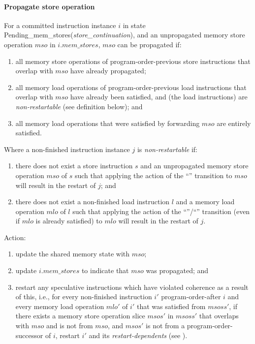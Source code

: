 \paragraph{Propagate store operation}\label{omm:prop_store}
For a committed instruction instance $i$ in state {\sc Pending\_mem\_stores}({\it store\_continuation}), and an unpropagated memory store operation $mso$ in $i.\textit{mem\_stores}$, $mso$ can be propagated if:
\begin{enumerate}
\item all memory store operations of program-order-previous store instructions that overlap with $mso$ have already propagated;
\item all memory load operations of program-order-previous load instructions that overlap with $mso$ have already been satisfied, and (the load instructions) are {\em non-restartable} (see definition below); and
\item all memory load operations that were satisfied by forwarding $mso$ are entirely satisfied.
\end{enumerate}
Where a non-finished instruction instance $j$ is {\em non-restartable} if:
\begin{enumerate}
\item there does not exist a store instruction $s$ and an unpropagated memory store operation $mso$ of $s$ such that applying the action of the ``'' transition to $mso$ will result in the restart of $j$; and
\item there does not exist a non-finished load instruction $l$ and a memory load operation $mlo$ of $l$ such that applying the action of the ``''/``'' transition (even if $mlo$ is already satisfied) to $mlo$ will result in the restart of $j$.
\end{enumerate}
Action:
\begin{enumerate}
\item update the shared memory state with $mso$;
\item update $i.\textit{mem\_stores}$ to indicate that $mso$ was propagated; and
\item restart any speculative instructions which have violated coherence as a result of this, i.e., for every non-finished instruction $i'$ program-order-after $i$ and every memory load operation $mlo'$ of $i'$ that was satisfied from $msoss'$, if there exists a memory store operation slice $msos'$ in $msoss'$ that overlaps with $mso$ and is not from $mso$, and $msos'$ is not from a program-order-successor of $i$, restart $i'$ and its {\em restart-dependents} (see ).
\end{enumerate}


